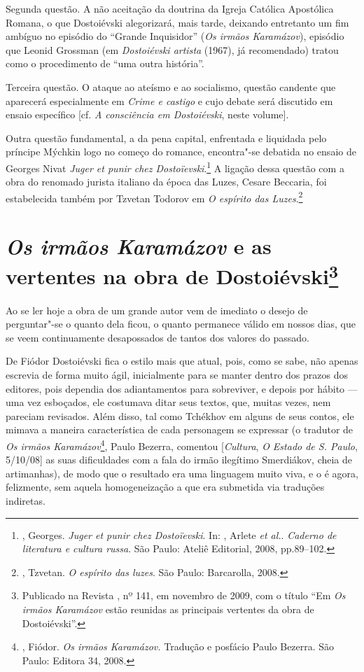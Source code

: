 Segunda questão. A não aceitação da doutrina da Igreja Católica
Apostólica Romana, o que Dostoiévski alegorizará, mais tarde,
deixando entretanto um fim ambíguo no episódio do ``Grande
Inquisidor'' (\emph{Os irmãos Karamázov}), episódio que
Leonid Grossman (em \emph{Dostoiévski artista} (1967),
já recomendado) tratou como o procedimento de ``uma outra
história''.

Terceira questão. O ataque ao ateísmo e ao socialismo, questão
candente que aparecerá especialmente em \emph{Crime e castigo}
e cujo debate será discutido em ensaio específico [cf.
\emph{A consciência em Dostoiévski}, neste volume].

Outra questão fundamental, a da pena capital, enfrentada e
liquidada pelo príncipe Mýchkin logo no começo do romance,
encontra"-se debatida no ensaio de Georges Nivat \emph{Juger
et punir chez Dostoïevski}.\footnote{, Georges.
\emph{Juger et punir chez Dostoïevski}. In: ,
Arlete \emph{et al.}. \emph{Caderno de literatura e cultura
russa}. São Paulo: Ateliê Editorial, 2008, pp.89--102.} A
ligação dessa questão com a obra do renomado jurista italiano
da época das Luzes, Cesare Beccaria, foi estabelecida também
por Tzvetan Todorov em \emph{O espírito das
Luzes}.\footnote{, Tzvetan. \emph{O espírito
das luzes}. São Paulo: Barcarolla, 2008.}

\chapter{\emph{Os irmãos Karamázov} e as vertentes na obra de
Dostoiévski\footnote{Publicado na Revista , nº 141, em novembro de 2009,
com o título ``Em \emph{Os irmãos Karamázov} estão reunidas as
principais vertentes da obra de Dostoiévski''.}}

Ao se ler hoje a obra de um grande autor vem de imediato o
desejo de perguntar"-se o quanto dela ficou, o quanto permanece
válido em nossos dias, que se veem continuamente desapossados de
tantos dos valores do passado.

De Fiódor Dostoiévski fica o estilo mais que atual, pois, como se sabe,
não apenas escrevia de forma muito ágil, inicialmente para se manter
dentro dos prazos dos editores, pois dependia dos adiantamentos para
sobreviver, e depois por hábito --- uma vez esboçados, ele costumava
ditar seus textos, que, muitas vezes, nem pareciam revisados. Além
disso, tal como Tchékhov em alguns de seus contos, ele mimava a maneira
característica de cada personagem se expressar (o tradutor de \emph{Os
irmãos Karamázov}\footnote{, Fiódor. \emph{Os irmãos
  Karamázov.} Tradução e posfácio Paulo Bezerra. São Paulo: Editora 34,
  2008.}, Paulo Bezerra, comentou [\emph{Cultura}, \emph{O Estado de S.
Paulo}, 5/10/08] as suas dificuldades com a fala do irmão ilegítimo
Smerdiákov, cheia de artimanhas), de modo que o resultado era uma
linguagem muito viva, e o é agora, felizmente, sem aquela homogeneização
a que era submetida via traduções indiretas.

